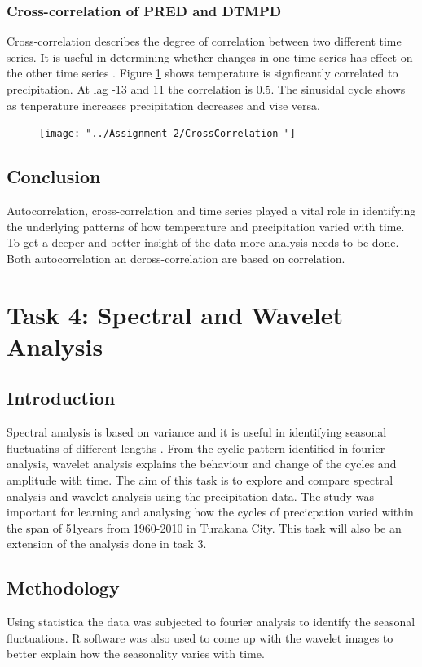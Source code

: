 \documentclass[12pt,a4paper]{article}
\begin{document}
\subsubsection{Cross-correlation of PRED and DTMPD}
Cross-correlation describes the degree of correlation between two different time series. It is useful in determining whether changes in one time series has effect on the other time series \cite{podobnik2008detrended}. Figure \ref{fig:crosscorrelation} shows temperature is signficantly correlated to precipitation. At lag -13 and 11 the correlation is 0.5. The sinusidal cycle shows as tenperature increases precipitation decreases and vise versa. 
\begin{figure}[h]
	\centering
	\texttt{[image: "../Assignment 2/CrossCorrelation "]}
	\caption{}
	\label{fig:crosscorrelation}
\end{figure}

\newpage
\subsection{Conclusion}
Autocorrelation, cross-correlation and time series played a vital role in identifying the underlying patterns of how temperature and precipitation varied with time. To get a deeper and better insight of the data more analysis needs to be done. Both autocorrelation an dcross-correlation are based on correlation.


\newpage
\section{Task 4: Spectral and Wavelet Analysis}
\subsection{Introduction}
Spectral analysis is based on variance and it is useful in identifying seasonal fluctuatins of different lengths \cite{koopmans1995spectral}. From the cyclic pattern identified in fourier analysis, wavelet analysis explains the behaviour and change of the cycles and amplitude with time. The aim of this task is to explore and compare spectral analysis and wavelet analysis using the precipitation data. The study was important for learning and analysing how the cycles of precicpation varied within the span of 51years from  1960-2010 in Turakana City. This task will also be an extension of the analysis done in task 3.
\subsection{Methodology}
Using statistica the data was subjected to fourier analysis to identify the seasonal fluctuations. R software was also used to come up with the wavelet images to better explain how the seasonality varies with time.  
\end{document}
